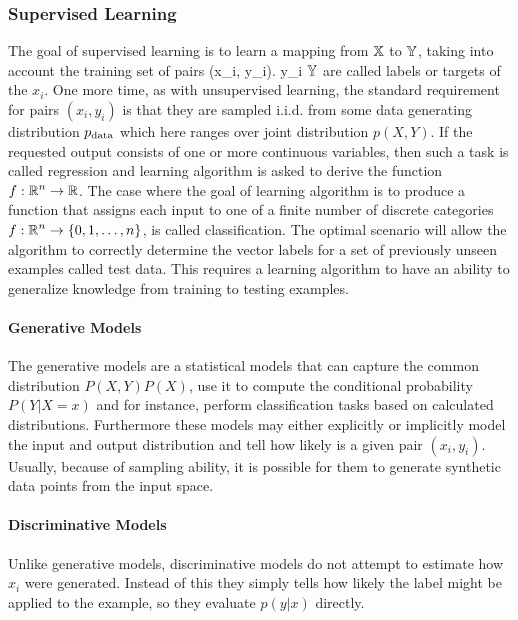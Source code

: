 \documentclass[12pt]{article}
\theoremstyle{definition}
\DeclareRobustCommand{\[}{\begin{equation}}
\DeclareRobustCommand{\]}{\end{equation}}
\begin{document}
        \subsubsection{Supervised Learning}
            The goal of supervised learning is to learn a mapping from $\displaystyle {\mathbb{X}}$ to $\displaystyle {\mathbb{Y}}$, taking into account the training set of pairs (x_i, y_i). \; y_i \in\;$\displaystyle {\mathbb{Y}}$ are called labels or  targets of the $x_i$. One more time, as with unsupervised learning, the standard requirement for pairs $(x_i, y_i)$ is that they are sampled i.i.d. from some data generating distribution $\displaystyle p_{\rm{data}}$  which here ranges over joint distribution $p(X, Y)$.
            If the requested output consists of one or more continuous variables, then such a task is called regression and learning algorithm is asked to derive the function $\displaystyle f: \displaystyle \mathbb{R}^n \rightarrow \displaystyle \mathbb{R}$. The case where the goal of learning algorithm is to produce a function that assigns each input to one of a finite number of discrete categories $\displaystyle f: \displaystyle \mathbb{R}^n \rightarrow \{0, 1, \dots, n \}$, is called classification. The optimal scenario will allow the algorithm to correctly determine the vector labels for a set of previously unseen examples called test data. This requires a learning algorithm to have an ability to generalize knowledge from training to testing examples. \cite{Semi-Supervised-Book} \cite{PatternRecognition} \cite{Goodfellow-et-al-2016}

        \paragraph{Generative Models}
            The generative models are a statistical models that can capture the common distribution $P(X, Y)P(X)$, use it to compute the conditional probability $P(Y | X = x)$ and for instance, perform classification tasks based on calculated distributions. Furthermore these models may either explicitly or implicitly model the
            input and output distribution and tell how likely is a given pair $(x_i, y_i)$. Usually, because of sampling ability, it is possible for them to generate synthetic data points from the input space.
            
        \paragraph{Discriminative Models}
            Unlike generative models, discriminative models do not attempt to estimate how $x_i$ were generated. Instead of this they simply tells how likely the label might be applied to the example, so they evaluate $p(y | x)$ directly.
             
\end{document}
